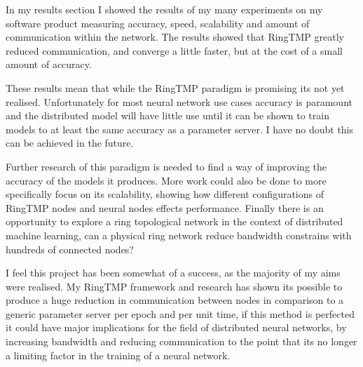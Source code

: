 In my results section I showed the results of my many experiments on my software
product measuring accuracy, speed, scalability and amount of communication
within the network. The results showed that RingTMP greatly reduced
communication, and converge a little faster, but at the cost of a small amount
of accuracy.

These results mean that while the RingTMP paradigm is promising its not yet
realised. Unfortunately for most neural network use cases accuracy is paramount
and the distributed model will have little use until it can be shown to train
models to at least the same accuracy as a parameter server. I have no doubt this
can be achieved in the future.

Further research of this paradigm is needed to find a way of improving the
accuracy of the models it produces. More work could also be done to more
specifically focus on its scalability, showing how different configurations of
RingTMP nodes and neural nodes effects performance. Finally there is an
opportunity to explore a ring topological network in the context of distributed
machine learning, can a physical ring network reduce bandwidth constrains with
hundreds of connected nodes?

I feel this project has been somewhat of a success, as the majority of my aims
were realised. My RingTMP framework and research has shown its possible to
produce a huge reduction in communication between nodes in comparison to a
generic parameter server per epoch and per unit time, if this method is
perfected it could have major implications for the field of distributed neural
networks, by increasing bandwidth and reducing communication to the point that
its no longer a limiting factor in the training of a neural network.